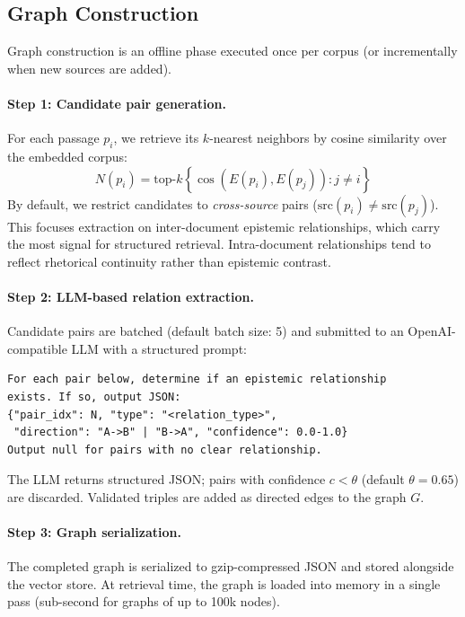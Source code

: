 \documentclass[11pt,a4paper]{article}
\begin{document}
\subsection{Graph Construction}
\label{sec:construction}

Graph construction is an offline phase executed once per corpus (or
incrementally when new sources are added).

\paragraph{Step 1: Candidate pair generation.}
For each passage $p_i$, we retrieve its $k$-nearest neighbors by
cosine similarity over the embedded corpus:
\[
  N(p_i) = \text{top-}k \left\{ \cos(E(p_i), E(p_j)) : j \neq i \right\}
\]
By default, we restrict candidates to \emph{cross-source} pairs
($\text{src}(p_i) \neq \text{src}(p_j)$). This focuses extraction on
inter-document epistemic relationships, which carry the most signal for
structured retrieval. Intra-document relationships tend to reflect
rhetorical continuity rather than epistemic contrast.

\paragraph{Step 2: LLM-based relation extraction.}
Candidate pairs are batched (default batch size: 5) and submitted to an
OpenAI-compatible LLM with a structured prompt:

\begin{lstlisting}
For each pair below, determine if an epistemic relationship
exists. If so, output JSON:
{"pair_idx": N, "type": "<relation_type>",
 "direction": "A->B" | "B->A", "confidence": 0.0-1.0}
Output null for pairs with no clear relationship.
\end{lstlisting}

The LLM returns structured JSON; pairs with confidence $c < \theta$
(default $\theta = 0.65$) are discarded. Validated triples are added as
directed edges to the graph $G$.

\paragraph{Step 3: Graph serialization.}
The completed graph is serialized to gzip-compressed JSON and stored
alongside the vector store. At retrieval time, the graph is loaded into
memory in a single pass (sub-second for graphs of up to 100k nodes).
\end{document}
